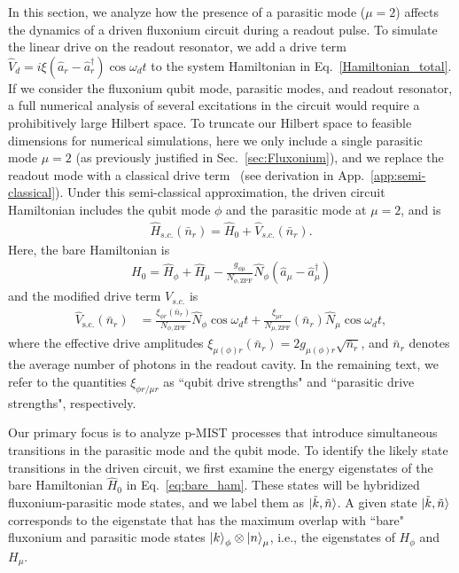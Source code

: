 \documentclass[%
reprint,
superscriptaddress,
 amsmath,amssymb,
 aps,
 prx,
longbibliography,
floatfix,
]{revtex4-2}
\begin{document}
In this section, we analyze how the presence of a parasitic mode ($\mu=2$) affects the dynamics of a driven fluxonium circuit during a readout pulse. To simulate the linear drive on the readout resonator, we add a drive term $\hat{V}_d=i\xi (\hat a_r-\hat a_r^\dagger)\cos{\omega_d t}$ to the system Hamiltonian in Eq.~\ref{Hamiltonian_total}. If we consider the fluxonium qubit mode, parasitic modes, and readout resonator, a full numerical analysis of several excitations in the circuit would require a prohibitively large Hilbert space. To truncate our Hilbert space to feasible dimensions for numerical simulations, here we only include a single parasitic mode $\mu=2$ (as previously justified in Sec.~\ref{sec:Fluxonium}), and we replace the readout mode with a classical drive term~\cite{cohen2023reminiscence,dumas2024unified,xiao2023diagrammatic} (see derivation in App.~\ref{app:semi-classical}). Under this semi-classical approximation, the driven circuit Hamiltonian includes the qubit mode $\phi$ and the parasitic mode at $\mu=2$, and is
\begin{align}
  \hat H_{s.c.}(\bar n_r)=\hat H_0+\hat V_{s.c.}(\bar n_r).  \label{eq:drive_Ham}
\end{align}
Here, the bare Hamiltonian is
\begin{align}
H_0=\hat H_\phi+\hat H_{\mu}-\frac{g_{\phi\mu}}{N_{\phi,\mathrm{ZPF}}} \hat N_\phi (\hat a_{\mu}-\hat a_{\mu}^\dagger) \label{eq:bare_ham} 
\end{align}
and the modified drive term $V_{s.c.}$ is
\begin{align}
    \hat V_\textrm{s.c.}(\bar n_r)&=\frac{\xi_{\phi r}(\bar n_r)}{N_{\phi,\mathrm{ZPF}}} \hat N_\phi\cos{\omega_d t}+\frac{\xi_{\mu r}}{N_{\mu, \mathrm{ZPF}}}(\bar n_r) \hat N_\mu\cos{\omega_d t}\label{eq:drive},
\end{align}
where the effective drive amplitudes $\xi_{\mu(\phi) r}(\bar n_r)=2g_{\mu(\phi) r}\sqrt{\bar n_r}$, and $\bar n_r$ denotes the average number of photons in the readout cavity. In the remaining text, we refer to the quantities $\xi_{\phi r/\mu r}$ as  ``qubit drive strengths" and ``parasitic drive strengths", respectively. 

Our primary focus is to analyze p-MIST processes that introduce simultaneous transitions in the parasitic mode and the qubit mode. To identify the likely state transitions in the driven circuit, we first examine the energy eigenstates of the bare Hamiltonian $\hat{H}_0$ in Eq.~\ref{eq:bare_ham}. These states will be hybridized fluxonium-parasitic mode states, and we label them as $\ket{\tilde{k}, \tilde{n}}$.  A given state $\ket{\tilde{k}, \tilde{n}}$ corresponds to the eigenstate that has the maximum overlap with ``bare" fluxonium and parasitic mode states $\ket{k}_\phi\otimes\ket{n}_\mu$, i.e., the eigenstates of $H_{\phi}$ and $H_{\mu}$.
\end{document}
